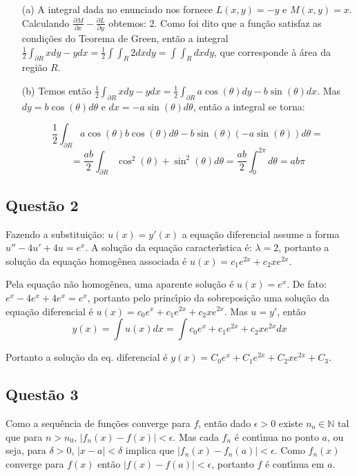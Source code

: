 \documentclass{report}
\begin{document}
\begin{enumerate}

\item[(a)] A integral dada no enunciado nos fornece $L(x,y)=-y$ e $M(x,y)=x$. Calculando $\displaystyle \frac{\partial M}{\partial x}-\frac{\partial L}{\partial y}$ obtemos: 2. Como foi dito que a fun\c c\~ao satisfaz as condi\c c\~oes do Teorema de Green, ent\~ao a integral $\displaystyle \frac1{2} \int_{\partial R} x dy - y dx=\displaystyle \frac1{2}\int\!\int_R 2 dx dy=\int\!\int_R dx dy$, que corresponde \`a \'area da regi\~ao $R$.

\item[(b)] Temos ent\~ao $\displaystyle \frac1{2} \int_{\partial R} x dy - y dx=\frac1{2} \int_{\partial R} a\cos(\theta) dy-b\sin(\theta) dx$. Mas $dy=b \cos(\theta)d\theta$ e $dx=-a \sin(\theta) d\theta$, ent\~ao a integral se torna: 

$$\frac1{2} \int_{\partial R} a\cos(\theta) b \cos(\theta)d\theta-b\sin(\theta) (-a \sin(\theta)) d\theta=$$ $$=\frac{ab}{2} \int_{\partial R}\cos^2(\theta)+\sin^2(\theta) d\theta=\frac{ab}{2}\int_0^{2\pi} d\theta=ab\pi$$

\end{enumerate}

\subsection{\color{red} Quest\~ao 2}

Fazendo a substitui\c c\~ao: $u(x)=y'(x)$ a equa\c c\~ao diferencial assume a forma $u''-4u'+4u=e^x$. A solu\c c\~ao da equa\c c\~ao caracter\'\i stica \'e: $\lambda=2$, portanto a solu\c c\~ao da equa\c c\~ao homog\^enea associada \'e $u(x)=c_1e^{2x}+c_2xe^{2x}$.

Pela equa\c c\~ao n\~ao homog\^enea, uma aparente solu\c c\~ao \'e $u(x)=e^x$. De fato: $e^x-4e^x+4e^x=e^x$, portanto pelo princ\'\i pio da sobreposi\c c\~ao uma solu\c c\~ao da equa\c c\~ao diferencial \'e $u(x)=c_0e^x+c_1e^{2x}+c_2xe^{2x}$. Mas $u=y'$, ent\~ao $$y(x)=\int u(x) dx=\int c_0e^x+c_1e^{2x}+c_2xe^{2x}dx$$

Portanto a solu\c c\~ao da eq. diferencial \'e $y(x)=C_0e^x+C_1e^{2x}+ C_2 xe^{2x}+C_3$.

\subsection{\color{red} Quest\~ao 3}

Como a sequ\^encia de fun\c c\~oes converge para $f$, ent\~ao dado $\epsilon>0$ existe $n_o \in \mathbb N$ tal que para $n>n_0$, $|f_n(x)-f(x)|<\epsilon$.  Mas cada $f_n$ \'e cont\'\i nua no ponto $a$, ou seja, para $\delta>0$, $|x-a|<\delta$ implica que $|f_n(x)-f_n(a)|<\epsilon$. Como $f_n(x)$ converge para $f(x)$ ent\~ao $|f(x)-f(a)|<\epsilon$, portanto $f$ \'e cont\'\i nua em $a$.
\end{document}
